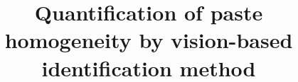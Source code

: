 \documentclass[pdflatex,sn-mathphys]{sn-jnl}%
\theoremstyle{thmstyleone}%
\theoremstyle{thmstyletwo}%
\theoremstyle{thmstylethree}%
\begin{document}
\title[Quantitative method for paste homogeneity]{Quantification of paste homogeneity by vision-based identification method}







\end{document}
